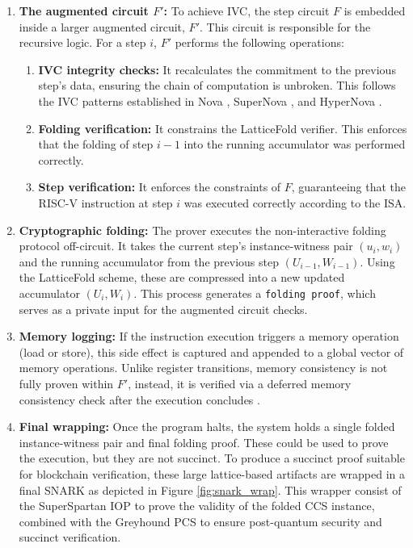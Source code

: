 \begin{enumerate}
	\item \textbf{The augmented circuit $F'$:} To achieve
	      IVC, the step circuit $F$ is embedded inside a larger augmented
	      circuit, $F'$. This circuit is responsible for the recursive logic.
	      For a step $i$, $F'$ performs the following operations:
	      \begin{enumerate}
		      \item \textbf{IVC integrity checks:} It recalculates the commitment to
		            the previous step's data, ensuring the chain of computation is
		            unbroken. This follows the IVC patterns established in Nova
		            \cite{Nova}, SuperNova \cite{SuperNova}, and HyperNova \cite{HyperNova}.
		      \item \textbf{Folding verification:} It constrains the LatticeFold
		            verifier. This enforces that the folding of step $i-1$ into the
		            running accumulator was performed correctly.
		      \item \textbf{Step verification:} It enforces the constraints of $F$,
		            guaranteeing that the RISC-V instruction at step $i$ was executed
		            correctly according to the ISA.
	      \end{enumerate}

	\item \textbf{Cryptographic folding:} The prover executes the non-interactive
	      folding protocol off-circuit. It takes the current step's instance-witness
	      pair $(u_i, w_i)$ and the running accumulator from the previous step
	      $(U_{i-1}, W_{i-1})$. Using the LatticeFold scheme, these are compressed
	      into a new updated accumulator $(U_i, W_i)$. This process generates a
	      \texttt{folding proof}, which serves as a private input for the
	      augmented circuit checks.

	\item \textbf{Memory logging:} If the instruction execution triggers a
	      memory operation (load or store), this side effect is captured and
	      appended to a global vector of memory operations. Unlike register
	      transitions, memory consistency is not fully proven within $F'$,
	      instead, it is verified via a deferred memory consistency check after
	      the execution concludes \cite{MemoryAccessInSnarks}.

	\item \textbf{Final wrapping:} Once the program halts, the system holds a
	      single folded instance-witness pair and final folding proof.
	      These could be used to prove the execution, but they are not succinct. To produce a
	      succinct proof suitable for blockchain verification, these large
	      lattice-based artifacts are wrapped in a final SNARK as depicted in Figure \ref{fig:snark_wrap}.
	      This wrapper consist of the SuperSpartan IOP \cite{HyperNova} to
	      prove the validity of the folded CCS instance, combined with the
	      Greyhound \cite{Greyhound} PCS to ensure post-quantum security and
	      succinct verification.
\end{enumerate}

